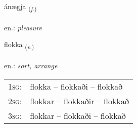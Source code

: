 \documentclass[frontgrid, backgrid]{flacards}\usepackage[]{graphicx}\usepackage[]{xcolor}
\begin{document}
\renewcommand{\flhead}{\vskip5pt \fboxsep=0pt {\small\bfseries\footnotesize Nafnorð | Noun}}
\renewcommand{\fcfoot}{\vskip5pt \fboxsep=0pt \hspace{2pt}{\small\bfseries\footnotesize 2K}}

\renewcommand{\blhead}{\vskip5pt {\small\bfseries\footnotesize Nafnorð | Noun }}
\renewcommand{\bcfoot}{\vskip5pt \hspace{2pt}{\small\bfseries\footnotesize 2K}}


{ánægja \small{\textsubscript{(\textit{f.})}} \\[1ex] %
\textphonetic{[auːnaija]} \\
en.: \emph{pleasure} \\  [2ex]
\renewcommand*{\arraystretch}{0.8}
}

\renewcommand{\flhead}{\vskip5pt \fboxsep=0pt {\small\bfseries\footnotesize Sagnorð | Verb}}
\renewcommand{\fcfoot}{\vskip5pt \fboxsep=0pt \hspace{2pt}{\small\bfseries\footnotesize 2K}}

\renewcommand{\blhead}{\vskip5pt {\small\bfseries\footnotesize Sagnorð | Verb }}
\renewcommand{\bcfoot}{\vskip5pt \hspace{2pt}{\small\bfseries\footnotesize 2K}}


{flokka \small{\textsubscript{(\textit{v.})}} \\[1ex] %
\textphonetic{[flɔhka]} \\
en.: \emph{sort, arrange} \\  [2ex]
\renewcommand*{\arraystretch}{0.8}
\begin{tabular}{p{1cm}l}
\textsc{1sg}: & flokka -- flokkaði -- flokkað \\ 
\textsc{2sg}: & flokkar -- flokkaðir -- flokkað \\ 
\textsc{3sg}: & flokkar -- flokkaði -- flokkað \\ 
\end{tabular}
}
\end{document}

